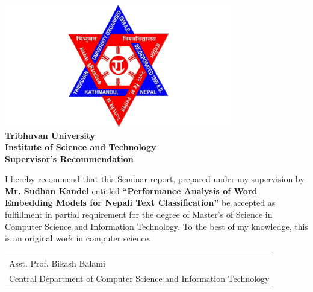 \documentclass[a4paper, 12pt]{report}
\begin{document}
\newpage
{}
\begin{center}

\vspace{70pt}\includegraphics[width=10cm]{images/Logo.png}\\
\textbf{\LARGE Tribhuvan University}\\[0.5cm]
\textbf{\large Institute of Science and Technology}\\[0.2cm]
\vspace{40pt}
\textbf{\large Supervisor’s Recommendation}\\
\end{center}
\justifying
I hereby recommend that this Seminar report, prepared under my supervision by \textbf{Mr. Sudhan Kandel} entitled \textbf{“Performance Analysis of Word Embedding Models for Nepali Text Classification”} be accepted as fulfillment in partial requirement for the degree of Master’s of Science in Computer Science and Information Technology. To the best of my knowledge, this is an original work in computer science. 
\vspace{70pt}

\begin{center}
\vspace{25mm}

\begin{tabular}{@{}p{2.5in}@{}}
\hrulefill \\
\centering  Asst. Prof. Bikash Balami\\
\centering Central Department of Computer Science and Information Technology
\end{tabular}
\end{center}
\end{document}
